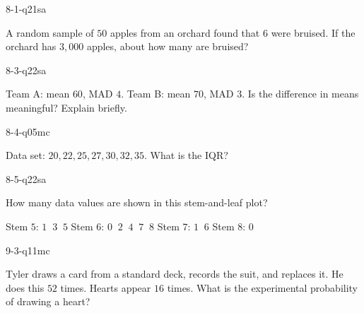 \begin{practiceQuestion}{8-1-q21}{sa}
\begin{questionText}
A random sample of $50$ apples from an orchard found that $6$ were bruised. If the orchard has $3{,}000$ apples, about how many are bruised?
\end{questionText}
\end{practiceQuestion}

\begin{practiceQuestion}{8-3-q22}{sa}
\begin{questionText}
Team A: mean $60$, MAD $4$. Team B: mean $70$, MAD $3$. Is the difference in means meaningful? Explain briefly.
\end{questionText}
\end{practiceQuestion}

\begin{practiceQuestion}{8-4-q05}{mc}
\begin{questionText}
Data set: $20, 22, 25, 27, 30, 32, 35$. What is the IQR?
\end{questionText}
\end{practiceQuestion}

\begin{practiceQuestion}{8-5-q22}{sa}
\begin{questionText}
How many data values are shown in this stem-and-leaf plot?

Stem $5$: $1\;\;3\;\;5$ \quad Stem $6$: $0\;\;2\;\;4\;\;7\;\;8$ \quad Stem $7$: $1\;\;6$ \quad Stem $8$: $0$
\end{questionText}
\end{practiceQuestion}

\begin{practiceQuestion}{9-3-q11}{mc}
\begin{questionText}
Tyler draws a card from a standard deck, records the suit, and replaces it. He does this $52$ times. Hearts appear $16$ times. What is the experimental probability of drawing a heart?
\end{questionText}
\end{practiceQuestion}

